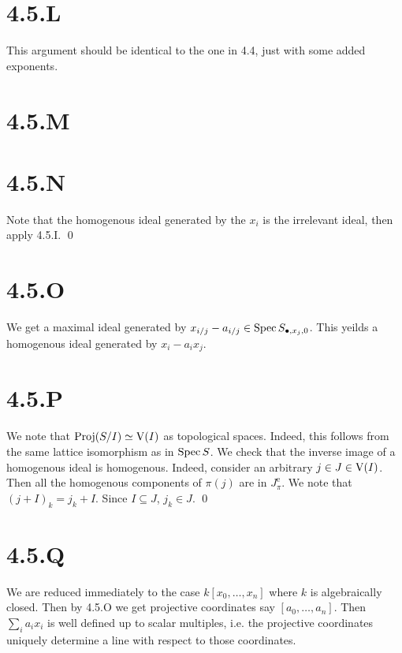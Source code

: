\documentclass{article}
\begin{document}
\section{4.5.L}
This argument should be identical to the one in 4.4, just with some added
exponents.

\section{4.5.M}
\section{4.5.N}
Note that the homogenous ideal generated by the $x_i$ is the
irrelevant ideal, then apply 4.5.I. \qed

\section{4.5.O}
We get a maximal ideal generated by $x_{i/j}-a_{i/j} \in \operatorname{Spec} S_{\bullet, x_j, 0}$. This yeilds a
homogenous ideal generated by $x_i-a_ix_j$.

\section{4.5.P}
We note that $\operatorname{Proj}(S/I) \simeq \operatorname{V}(I)$ as topological spaces. Indeed, this
follows from the same lattice isomorphism as in $\operatorname{Spec} S$. We
check that the inverse image of a homogenous ideal is homogenous. Indeed,
consider an arbitrary $j \in J \in \operatorname{V}(I)$. Then all the homogenous
components of $\pi(j)$ are in $J^{\text{e}}_{\pi}$. We note
that $(j+I)_k = j_k+I$. Since $I \subseteq J$,
$j_k \in J$. \qed

\section{4.5.Q}
We are reduced immediately to the case $k[x_0,\dots, x_n]$ where
$k$ is algebraically closed. Then by 4.5.O we get
projective coordinates say $[a_0, \dots, a_n]$. Then
$\sum_i a_ix_i$ is well defined up to scalar multiples, i.e. the
projective coordinates uniquely determine a line with respect to those
coordinates.
\end{document}
